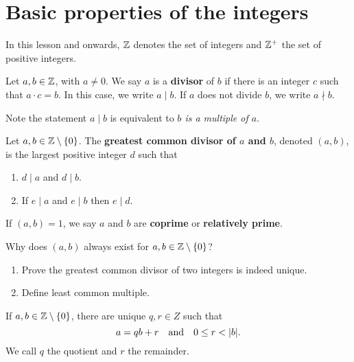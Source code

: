 \documentclass[11pt,a4paper]{article}
\begin{document}
\def\contador{25}


\section{Basic properties of the integers}

In this lesson and onwards,   $\mathbb{Z}$ denotes  the set of integers and  $\mathbb{Z}^{+}$  the set of positive integers.

\begin{defi}
Let $a,b\in \mathbb{Z}$, with $a\neq 0$. We say  $a$ is a \textbf{divisor} of $b$ if there is an integer $c$ such that $a\cdot c=b$. In this case, we write $a\mid b.$ 
If $a$ does not divide $b$, we write $a\nmid b$.
\end{defi}

Note the statement \(a\mid b\) is equivalent to \textit{\(b\) is a multiple of \(a\)}.

\begin{defi}
    Let $a,b\in \mathbb{Z}\setminus\{0\}$.
    The \textbf{greatest common divisor of $a$ and $b$}, denoted \((a,b)\), is the  largest positive integer \(d\) such that 
    \begin{enumerate}
        \item $d\mid a$ and $d\mid b.$
        \item If $e\mid a$ and $e\mid b$ then $e\mid d.$
    \end{enumerate}
    If  $(a,b)=1$, we say  $a$ and $b$ are \textbf{coprime} or \textbf{relatively prime}.
\end{defi}

\begin{que}
    Why does $(a,b)$ always exist for $a,b\in \mathbb{Z}\setminus\{0\}$?
\end{que}



\begin{eje}
    \begin{enumerate}[label=(\roman*)]
        \item Prove the greatest common divisor of two integers is indeed unique.
        \item Define  least common multiple.
    \end{enumerate}
    
\end{eje}



\begin{teo}
    If \(a,b\in \mathbb{Z}\setminus\{0\}\), 
    there are unique \(q,r\in Z\)
    such that 
    \[a= qb +r \quad\text{and}\quad 0\leq r < |b|.\]
    We call \(q\) the quotient and \(r\) the remainder.
\end{teo}
\end{document}
